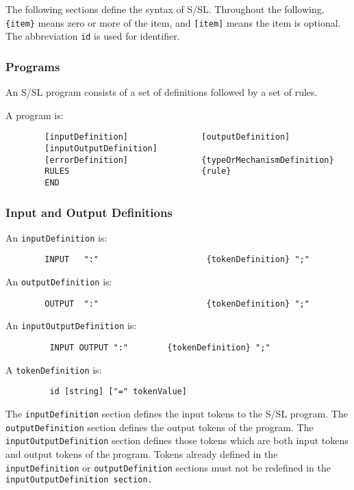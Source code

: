 The      following  sections  define  the  syntax  of  S/SL.
Throughout the following, {\tt \{item\}} means zero or more  of the
item,  and {\tt [item]} means the item is optional.  The abbreviation 
{\tt id} is used for identifier.


\subsubsection{Programs}

An S/SL program consists of a set of definitions followed
by a set of rules.

A program is:
\begin{verbatim}
        [inputDefinition]               [outputDefinition]
        [inputOutputDefinition]
        [errorDefinition]               {typeOrMechanismDefinition}
        RULES                           {rule}             
        END
\end{verbatim}


\subsubsection{Input and Output Definitions}

An {\tt inputDefinition} is:
\begin{verbatim}
        INPUT   ":"                      {tokenDefinition} ";"
\end{verbatim}

An {\tt outputDefinition} is:
\begin{verbatim}
        OUTPUT  ":"                      {tokenDefinition} ";"
\end{verbatim}


An {\tt inputOutputDefinition} is:
\begin{verbatim}
         INPUT OUTPUT ":"        {tokenDefinition} ";"
\end{verbatim}


A {\tt tokenDefinition} is:
\begin{verbatim}
         id [string] ["=" tokenValue]
\end{verbatim}


The {\tt inputDefinition} section defines the input  tokens  to
the  S/SL program.  The {\tt outputDefinition} section defines the
output tokens of  the  program.   The  {\tt inputOutputDefinition}
section defines those tokens which are both input tokens and
output tokens of the program.  Tokens already defined in the
{\tt inputDefinition} or  {\tt outputDefinition} sections
must not be
redefined in the {\tt inputOutputDefinition section.}

